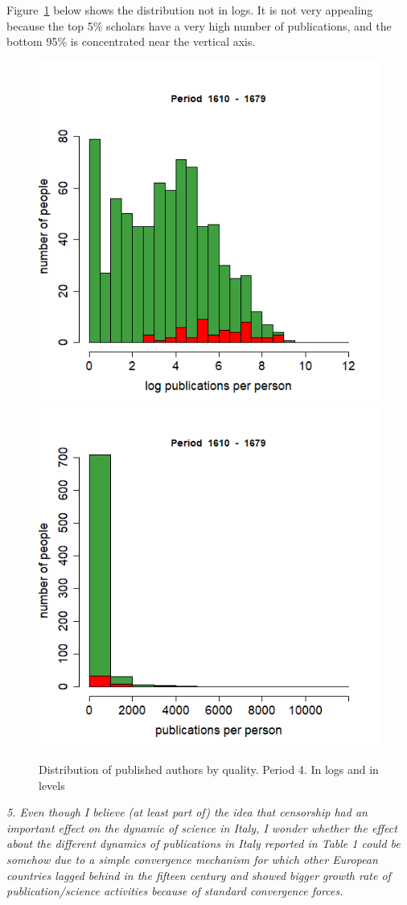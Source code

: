 \documentclass[12pt]{article}
\begin{document}
Figure~\ref{fig:distrib} below shows the distribution not in logs. It is not very appealing because the top 5\% scholars have a very high number of publications, and the bottom 95\% is concentrated near the vertical axis.



\begin{figure}[htbp]

\includegraphics[width=.32\textwidth,trim=0cm 0cm 0cm 1cm, clip]{histo4Q.png}
\includegraphics[width=.32\textwidth,trim=0cm 0cm 0cm 1cm, clip]{histo4Q-exp.png}

\caption{Distribution of published authors by quality. Period 4. In logs and in levels }\label{fig:distrib}

\end{figure}



\textit{
5. Even though I believe (at least part of) the idea that censorship had an important effect on the dynamic of
science in Italy, I wonder whether the effect about the different dynamics of publications in Italy reported in
Table 1 could be somehow due to a simple convergence mechanism for which other European countries
lagged behind in the fifteen century and showed bigger growth rate of publication/science activities because
of standard convergence forces.
}
\end{document}
